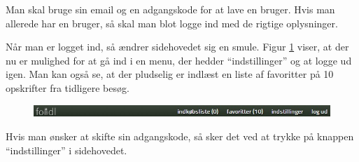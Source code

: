 Man skal bruge sin email og en adgangskode for at lave en bruger. Hvis man allerede har en bruger, så skal man blot logge ind med de rigtige oplysninger.

Når man er logget ind, så ændrer sidehovedet sig en smule. Figur \ref{fig:foodl-loggetind} viser, at der nu er mulighed for at gå ind i en menu, der hedder ``indstillinger'' og at logge ud igen. Man kan også se, at der pludselig er indlæst en liste af favoritter på 10 opskrifter fra tidligere besøg.


\begin{figure}[H]
	\centering
	\includegraphics[scale=0.7]{billeder/foodl/header-login.jpg}
	\label{fig:foodl-loggetind}
\end{figure}

Hvis man ønsker at skifte sin adgangskode, så sker det ved at trykke på knappen ``indstillinger'' i sidehovedet.

